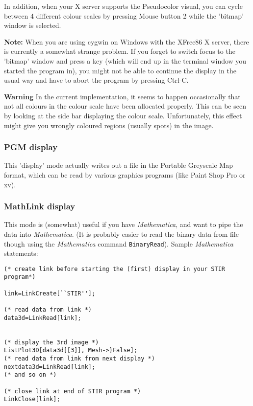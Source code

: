 \documentclass{article}
\begin{document}
In addition, when your X server supports the Pseudocolor visual, 
you can cycle between 4 different colour scales by pressing Mouse 
button 2 while the 'bitmap' window is selected.


\textbf{Note:} When you are using cygwin on Windows with the XFree86 
X server, there is currently a somewhat strange problem. If you 
forget to switch focus to the 'bitmap' window and press a key 
(which will end up in the terminal window you started the program 
in), you might not be able to continue the display in the usual 
way and have to abort the program by pressing Ctrl-C. 


\textbf{Warning} In the current implementation, it seems to happen 
occasionally that not all colours in the colour scale have been 
allocated properly. This can be seen by looking at the side bar 
displaying the colour scale. Unfortunately, this effect might 
give you wrongly coloured regions (usually spots) in the image.


\subsubsection{
PGM display}

This 'display' mode actually writes out a file in the Portable 
Greyscale Map format, which can be read by various graphics programs 
(like Paint Shop Pro or xv).


\subsubsection{
MathLink display}

This mode is (somewhat) useful if you have \textit{Mathematica\texttrademark}, 
and want to pipe the data into \textit{Mathematica}. (It is probably 
easier to read the binary data from file though using the \textit{Mathematica} command \texttt{BinaryRead}). 
Sample \textit{Mathematica} statements:

\begin{verbatim}
(* create link before starting the (first) display in your STIR 
program*)

link=LinkCreate[``STIR''];

(* read data from link *)
data3d=LinkRead[link];


(* display the 3rd image *)
ListPlot3D[data3d[[3]], Mesh->}False];
(* read data from link from next display *)
nextdata3d=LinkRead[link];
(* and so on *)

(* close link at end of STIR program *)
LinkClose[link];
\end{verbatim}
\end{document}
